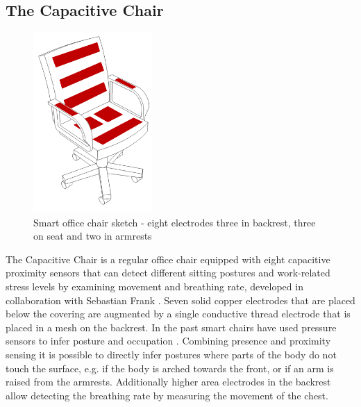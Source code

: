 \subsection{The Capacitive Chair}
\begin{figure}[h]
\centering
\includegraphics[width=0.4\textwidth]{images/smartofficechair}
\caption{Smart office chair sketch - eight electrodes three in backrest, three on seat and two in armrests}
\label{fig:smartchair_sketch}
\end{figure}
The Capacitive Chair is a regular office chair equipped with eight capacitive proximity sensors that can detect different sitting postures and work-related stress levels by examining movement and breathing rate, developed in collaboration with Sebastian Frank \cite{Braun2013ChairAid}. Seven solid copper electrodes that are placed below the covering are augmented by a single conductive thread electrode that is placed in a mesh on the backrest. In the past smart chairs have used pressure sensors to infer posture and occupation \cite{tan2001sensing}. Combining presence and proximity sensing it is possible to directly infer postures where parts of the body do not touch the surface, e.g. if the body is arched towards the front, or if an arm is raised from the armrests. Additionally higher area electrodes in the backrest allow detecting the breathing rate by measuring the movement of the chest.

